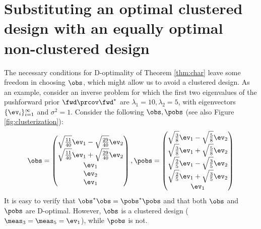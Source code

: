 \section{Substituting an optimal clustered design with an equally optimal non-clustered design}\label{section:how}
%
The necessary conditions for D-optimality of Theorem \ref{thm:char}
leave some freedom in choosing $\obs$, which might allow us to avoid a
clustered design. As an example, consider an inverse problem for which
the first two eigenvalues of the pushforward prior $\fwd \prcov\fwd^*$
are $\lambda_1 = 10, \lambda_2 = 5$, with eigenvectors
$\{\ev_i\}_{i=1}^\infty$ and $\sigma^2=1$. Consider the following
$\obs, \pobs$ (see also Figure \ref{fig:clusterization}):
\begin{equation}\label{eq:two designs}
  \obs =
  \begin{pmatrix}
    \sqrt{\frac{11}{40}}\ev_1 - \sqrt{\frac{29}{40}}\ev_2 \\
    \sqrt{\frac{11}{40}}\ev_1 + \sqrt{\frac{29}{40}}\ev_2 \\
    \ev_1 \\
    \ev_2 \\
    \ev_1 \\    
  \end{pmatrix},
  \pobs =
  \begin{pmatrix}
    \sqrt{\frac{3}{8}}\ev_1 - \sqrt{\frac{5}{8}}\ev_2 \\
    \sqrt{\frac{3}{8}}\ev_1 + \sqrt{\frac{5}{8}}\ev_2 \\
    \sqrt{\frac{2}{5}}\ev_1 - \sqrt{\frac{3}{5}}\ev_2 \\
    \sqrt{\frac{2}{5}}\ev_1 + \sqrt{\frac{3}{5}}\ev_2 \\
    \ev_1 \\    
  \end{pmatrix}
\end{equation}
\noindent It is easy to verify that $\obs^*\obs = \pobs^*\pobs$
and that both $\obs$ and $\pobs$ are D-optimal. However, $\obs$
is a clustered design ($\meas_3 = \meas_5 = \ev_1$), while $\pobs$ is
not.

